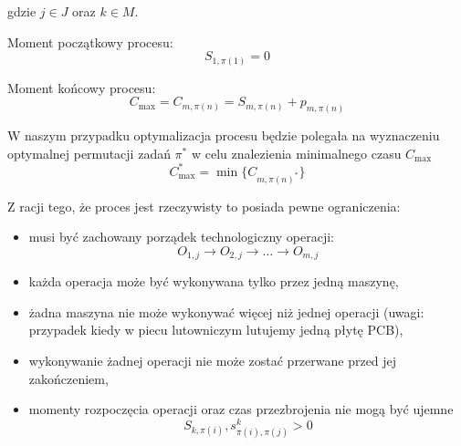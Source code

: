 gdzie $ j \in J$ oraz $k \in M$.

\breakparagraph{}
Moment początkowy procesu:
\begin{equation}
	S_{1, \pi(1)}=0
\end{equation}

\breakparagraph{}
Moment końcowy procesu:
\begin{equation}
	C_{\max} = 	C_{m, \pi(n)} = S_{m, \pi(n)} + p_{m, \pi(n)}
\end{equation}

\breakparagraph{}
W naszym przypadku optymalizacja procesu będzie polegała na wyznaczeniu optymalnej permutacji zadań $\pi^*$
w celu znalezienia minimalnego czasu $C_{\max}$
\begin{equation}
	C_{\max}^{*} = \min\{C_{m, \pi{(n)}^{*}}\}
\end{equation}

\breakparagraph{}
Z racji tego, że proces jest rzeczywisty to posiada pewne ograniczenia:
\begin{itemize}
	\item musi być zachowany porządek technologiczny operacji:
	      \begin{equation}
	      	O_{1, j} \rightarrow O_{2, j} \rightarrow \dots \rightarrow O_{m, j}
	      \end{equation}
	\item każda operacja może być wykonywana tylko przez jedną maszynę,
	\item żadna maszyna nie może wykonywać więcej niż jednej operacji (uwagi: przypadek kiedy w piecu lutowniczym lutujemy jedną płytę PCB),
	\item wykonywanie żadnej operacji nie może zostać przerwane przed jej zakończeniem,
	\item momenty rozpoczęcia operacji oraz czas przezbrojenia nie mogą być ujemne
	      \begin{equation}
	      	S_{k, \pi(i)}, s^{k}_{\pi(i), \pi(j)} > 0
	      \end{equation}
\end{itemize}
